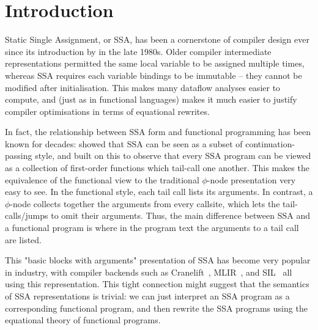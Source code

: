 \documentclass[acmsmall,screen,review]{acmart}
\begin{document}



\maketitle


\section{Introduction}

Static Single Assignment, or SSA, has been a cornerstone of compiler design ever
since its introduction by \cite{ssa-original,rosen-gvn-1988} in the late 1980s.
Older compiler intermediate representations permitted the same local variable to
be assigned multiple times, whereas SSA requires each variable bindings to be
immutable -- they cannot be modified after initialisation. This makes many
dataflow analyses easier to compute, and (just as in functional languages) makes
it much easier to justify compiler optimisations in terms of equational
rewrites.

In fact, the relationship between SSA form and functional programming has been
known for decades: \citet{kelsey-ssa-cps} showed that SSA can be seen as a
subset of continuation-passing style, and \citet{appel-ssa} built on this to
observe that every SSA program can be viewed as a collection of first-order
functions which tail-call one another. This makes the equivalence of the
functional view to the traditional $\phi$-node presentation very easy to see. In
the functional style, each tail call lists its arguments. In contrast, a
$\phi$-node collects together the arguments from every callsite, which lets the
tail-calls/jumps to omit their arguments. Thus, the main difference between SSA
and a functional program is where in the program text the arguments to a tail
call are listed.

This "basic blocks with arguments" presentation of SSA has become very popular
in industry, with compiler backends such as Cranelift~\cite{cranelift},
MLIR~\cite{mlir}, and SIL~\cite{SIL} all using this representation. This tight
connection might suggest that the semantics of SSA representations is trivial:
we can just interpret an SSA program as a corresponding functional program, and
then rewrite the SSA programs using the equational theory of functional
programs.
\end{document}
